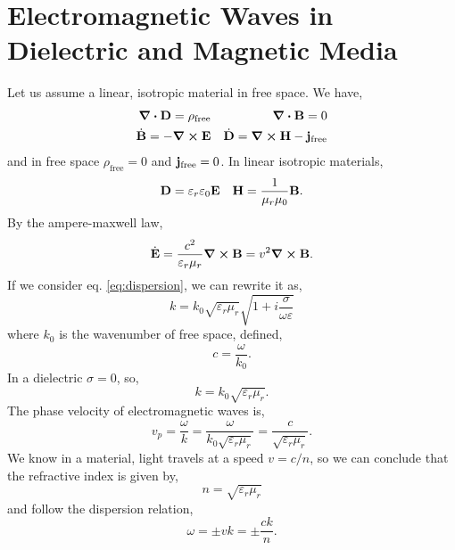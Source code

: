 \documentclass{book}
\begin{document}
\section{Electromagnetic Waves in Dielectric and Magnetic Media}
Let us assume a linear, isotropic material in free space. We have,
\begin{align}
	\div{\vb{D}} = \rho_{\text{free}} && \div{\vb{B}} = 0 \\
	\Dot{\vb{B}} = - \curl{\vb{E}} && \Dot{\vb{D}} = \curl{\vb{H}} - \vb{j}_{\text{free}}
\end{align}
and in free space $\rho_{\text{free}} = 0$ and $\vb{j}_{\text{free}} = 0$. In linear isotropic materials,
\begin{align}
	\vb{D} = \varepsilon_r \varepsilon_0  \vb{E} && \vb{H}= \frac{1}{\mu_r\mu_0}\vb{B}.
\end{align}
By the ampere-maxwell law,
\begin{equation}
	\Dot{\vb{E}} = \frac{c^2}{\varepsilon_r\mu_r}\curl{\vb{B}} = v^2 \curl{\vb{B}}.
\end{equation}
If we consider eq. \eqref{eq:dispersion}, we can rewrite it as,
\begin{equation}
	k = k_0 \sqrt{\varepsilon_r\mu_r}\sqrt{1 + i\frac{\sigma}{\omega \varepsilon}}
\end{equation}
where $k_0$ is the wavenumber of free space, defined,
\begin{equation}
	c = \frac{\omega}{k_0}.
\end{equation}
In a dielectric $\sigma =0$, so,
\begin{equation}
	k = k_0 \sqrt{\varepsilon_r \mu_r}.
\end{equation}
The phase velocity of electromagnetic waves is,
\begin{equation}
	v_p = \frac{\omega}{k} = \frac{\omega}{k_0\sqrt{\varepsilon_r\mu_r}} = \frac{c}{\sqrt{\varepsilon_r\mu_r}}.
\end{equation}
We know in a material, light travels at a speed $v = c/n$, so we can conclude that the refractive index is given by,
\begin{equation}
	\boxed{n = \sqrt{\varepsilon_r\mu_r}}
\end{equation}
and follow the dispersion relation,
\begin{equation}
	\boxed{\omega = \pm vk = \pm \frac{ck}{n}}.
\end{equation}
\end{document}
